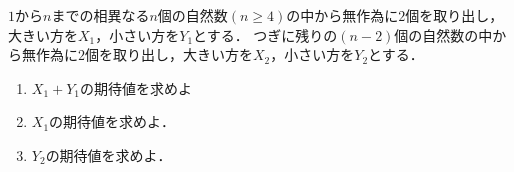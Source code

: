 \documentclass[../../main.tex]{subfiles}
\begin{document}
$1$から$n$までの相異なる$n$個の自然数$(n\ge 4)$の中から無作為に$2$個を取り出し，大きい方を$X_1$，小さい方を$Y_1$とする．
つぎに残りの$(n-2)$個の自然数の中から無作為に$2$個を取り出し，大きい方を$X_2$，小さい方を$Y_2$とする．
\begin{enumerate}
  \item $X_1+Y_1$の期待値を求めよ
  \item $X_1$の期待値を求めよ．
  \item $Y_2$の期待値を求めよ．
\end{enumerate}
\end{document}
